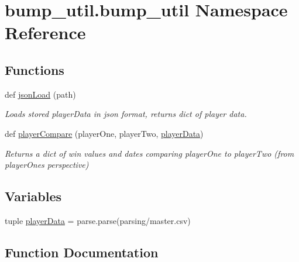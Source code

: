 \hypertarget{namespacebump__util_1_1bump__util}{}\section{bump\+\_\+util.\+bump\+\_\+util Namespace Reference}
\label{namespacebump__util_1_1bump__util}
\subsection*{Functions}
\begin{DoxyCompactItemize}
\item 
def \hyperlink{namespacebump__util_1_1bump__util_a5acbe32daf1dc325c25f389660042335}{json\+Load} (path)
\begin{DoxyCompactList}\small\item\em Loads stored player\+Data in json format, returns dict of player data. \end{DoxyCompactList}\item 
def \hyperlink{namespacebump__util_1_1bump__util_a3c39ef3dcda4be5a3f0c2ccbb573d5a2}{player\+Compare} (player\+One, player\+Two, \hyperlink{namespacebump__util_1_1bump__util_a476803a0585b05a795f63b956ca0a0cf}{player\+Data})
\begin{DoxyCompactList}\small\item\em Returns a dict of win values and dates comparing player\+One to player\+Two (from player\+One\textquotesingle{}s perspective) \end{DoxyCompactList}\end{DoxyCompactItemize}
\subsection*{Variables}
\begin{DoxyCompactItemize}
\item 
tuple \hyperlink{namespacebump__util_1_1bump__util_a476803a0585b05a795f63b956ca0a0cf}{player\+Data} = parse.\+parse(\textquotesingle{}parsing/master.\+csv\textquotesingle{})
\end{DoxyCompactItemize}


\subsection{Function Documentation}
\hypertarget{namespacebump__util_1_1bump__util_a5acbe32daf1dc325c25f389660042335}{}
